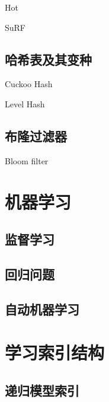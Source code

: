 Hot

SuRF

\subsection{哈希表及其变种}

Cuckoo Hash

Level Hash

\subsection{布隆过滤器}

Bloom filter

\section{机器学习}

\subsection{监督学习}

\subsection{回归问题}

\subsection{自动机器学习}

\section{学习索引结构}

\subsection{递归模型索引}
